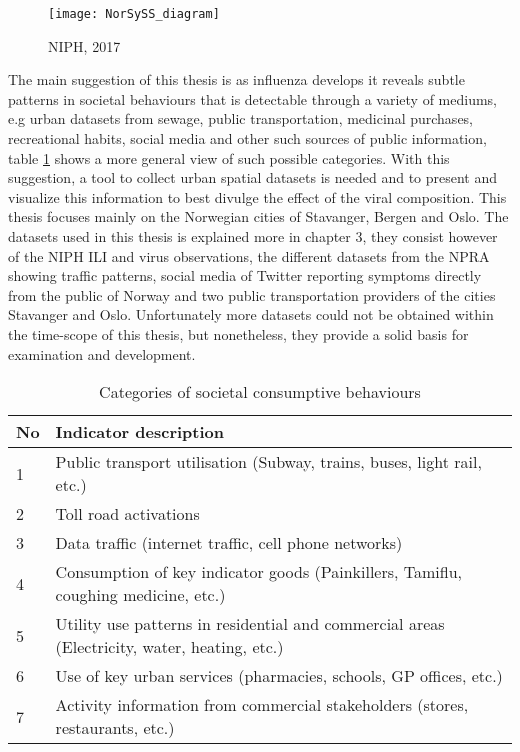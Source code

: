 \begin{figure}[h]
\texttt{[image: NorSySS\_diagram]}
\centering
\caption{NIPH, 2017}
\label{fig:norsyss}
\end{figure}

The main suggestion of this thesis is as influenza develops it reveals subtle patterns in societal behaviours that is detectable through a variety of mediums, e.g urban datasets from sewage, public transportation, medicinal purchases, recreational habits, social media and other such sources of public information, table \ref{table:2} shows a more general view of such possible categories. With this suggestion, a tool to collect urban spatial datasets is needed and to present and visualize this information to best divulge the effect of the viral composition. This thesis focuses mainly on the Norwegian cities of Stavanger, Bergen and Oslo. The datasets used in this thesis is explained more in chapter 3, they consist however of the NIPH ILI and virus observations, the different datasets from the NPRA showing traffic patterns, social media of Twitter reporting symptoms directly from the public of Norway and two public transportation providers of the cities Stavanger and Oslo. Unfortunately more datasets could not be obtained within the time-scope of this thesis, but nonetheless, they provide a solid basis for examination and development.


\begin{center}
\begin{table}
\begin{tabular}{ | m{2em} | m{14cm}| }
 \hline
 \textbf{No} & \textbf{Indicator description} \\ [0.5ex] 
 \hline
 1 & Public transport utilisation (Subway, trains, buses, light rail, etc.) \\ 
  \hline
 2 & Toll road activations \\
  \hline
 3 & Data traffic (internet traffic, cell phone networks) \\
  \hline
 4 & Consumption of key indicator goods (Painkillers, Tamiflu, coughing medicine, etc.) \\
  \hline
 5 & Utility use patterns in residential and commercial areas (Electricity, water, heating, etc.) \\
 \hline
 6 & Use of key urban services (pharmacies, schools, GP offices, etc.) \\  
 \hline
 7 & Activity information from commercial stakeholders (stores, restaurants, etc.) \\ 
 \hline
\end{tabular}
 \caption{Categories of societal consumptive behaviours}
 \label{table:2}
\end{table}
\end{center}


